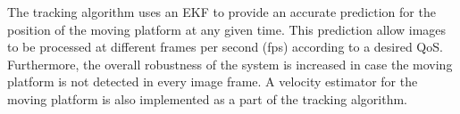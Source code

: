 \documentclass[conference]{IEEEtran}
\begin{document}
%
%
%
%

The tracking algorithm uses an EKF to provide an accurate
prediction for the position of the moving platform at any given
time. This prediction allow images to be processed at different frames per second (fps)
according to a desired QoS. Furthermore, the overall robustness of the
system is increased in case the moving platform is not detected in
every image frame. A velocity estimator for the moving platform is
also implemented as a part of the tracking algorithm.


%
\end{document}
